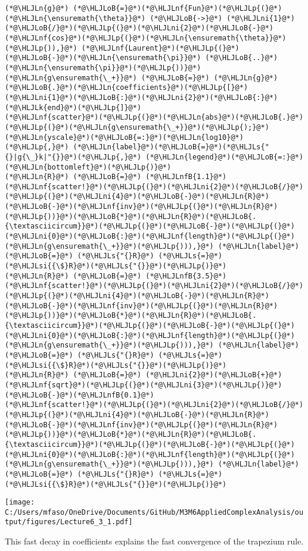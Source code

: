 \documentclass[12pt,landscape]{article}
\newcommand{\HLJLk}[1]{\textcolor[RGB]{148,91,176}{\textbf{#1}}}
\newcommand{\HLJLn}[1]{#1}
\newcommand{\HLJLnf}[1]{\textcolor[RGB]{66,102,213}{#1}}
\newcommand{\HLJLs}[1]{\textcolor[RGB]{201,61,57}{#1}}
\newcommand{\HLJLsi}[1]{#1}
\newcommand{\HLJLnfB}[1]{\textcolor[RGB]{59,151,46}{#1}}
\newcommand{\HLJLni}[1]{\textcolor[RGB]{59,151,46}{#1}}
\newcommand{\HLJLoB}[1]{\textcolor[RGB]{102,102,102}{\textbf{#1}}}
\newcommand{\HLJLp}[1]{#1}
\def\cent#1{\begin{center}#1\end{center} }
\begin{document}
{\newpage
\begin{lstlisting}
(*@\HLJLn{g}@*) (*@\HLJLoB{=}@*)(*@\HLJLnf{Fun}@*)(*@\HLJLp{(}@*)(*@\HLJLn{\ensuremath{\theta}}@*) (*@\HLJLoB{->}@*) (*@\HLJLni{1}@*)(*@\HLJLoB{/}@*)(*@\HLJLp{(}@*)(*@\HLJLni{2}@*)(*@\HLJLoB{-}@*)(*@\HLJLnf{cos}@*)(*@\HLJLp{(}@*)(*@\HLJLn{\ensuremath{\theta}}@*)(*@\HLJLp{)),}@*) (*@\HLJLnf{Laurent}@*)(*@\HLJLp{(}@*)(*@\HLJLoB{-}@*)(*@\HLJLn{\ensuremath{\pi}}@*) (*@\HLJLoB{..}@*) (*@\HLJLn{\ensuremath{\pi}}@*)(*@\HLJLp{))}@*)
(*@\HLJLn{g\ensuremath{\_+}}@*) (*@\HLJLoB{=}@*) (*@\HLJLn{g}@*)(*@\HLJLoB{.}@*)(*@\HLJLn{coefficients}@*)(*@\HLJLp{[}@*)(*@\HLJLni{1}@*)(*@\HLJLoB{:}@*)(*@\HLJLni{2}@*)(*@\HLJLoB{:}@*)(*@\HLJLk{end}@*)(*@\HLJLp{]}@*)
(*@\HLJLnf{scatter}@*)(*@\HLJLp{(}@*)(*@\HLJLn{abs}@*)(*@\HLJLoB{.}@*)(*@\HLJLp{(}@*)(*@\HLJLn{g\ensuremath{\_+}}@*)(*@\HLJLp{);}@*) (*@\HLJLn{yscale}@*)(*@\HLJLoB{=:}@*)(*@\HLJLn{log10}@*)(*@\HLJLp{,}@*) (*@\HLJLn{label}@*)(*@\HLJLoB{=}@*)(*@\HLJLs{"{}|g{\_}k|"{}}@*)(*@\HLJLp{,}@*) (*@\HLJLn{legend}@*)(*@\HLJLoB{=:}@*)(*@\HLJLn{bottomleft}@*)(*@\HLJLp{)}@*)
(*@\HLJLn{R}@*) (*@\HLJLoB{=}@*) (*@\HLJLnfB{1.1}@*)
(*@\HLJLnf{scatter!}@*)(*@\HLJLp{(}@*)(*@\HLJLni{2}@*)(*@\HLJLoB{/}@*)(*@\HLJLp{(}@*)(*@\HLJLni{4}@*)(*@\HLJLoB{-}@*)(*@\HLJLn{R}@*)(*@\HLJLoB{-}@*)(*@\HLJLnf{inv}@*)(*@\HLJLp{(}@*)(*@\HLJLn{R}@*)(*@\HLJLp{))}@*)(*@\HLJLoB{*}@*)(*@\HLJLn{R}@*)(*@\HLJLoB{.{\textasciicircum}}@*)(*@\HLJLp{(}@*)(*@\HLJLoB{-}@*)(*@\HLJLp{(}@*)(*@\HLJLni{0}@*)(*@\HLJLoB{:}@*)(*@\HLJLnf{length}@*)(*@\HLJLp{(}@*)(*@\HLJLn{g\ensuremath{\_+}}@*)(*@\HLJLp{))),}@*) (*@\HLJLn{label}@*) (*@\HLJLoB{=}@*) (*@\HLJLs{"{}R}@*) (*@\HLJLs{=}@*) (*@\HLJLsi{{\$}R}@*)(*@\HLJLs{"{}}@*)(*@\HLJLp{)}@*)
(*@\HLJLn{R}@*) (*@\HLJLoB{=}@*) (*@\HLJLnfB{3.5}@*)
(*@\HLJLnf{scatter!}@*)(*@\HLJLp{(}@*)(*@\HLJLni{2}@*)(*@\HLJLoB{/}@*)(*@\HLJLp{(}@*)(*@\HLJLni{4}@*)(*@\HLJLoB{-}@*)(*@\HLJLn{R}@*)(*@\HLJLoB{-}@*)(*@\HLJLnf{inv}@*)(*@\HLJLp{(}@*)(*@\HLJLn{R}@*)(*@\HLJLp{))}@*)(*@\HLJLoB{*}@*)(*@\HLJLn{R}@*)(*@\HLJLoB{.{\textasciicircum}}@*)(*@\HLJLp{(}@*)(*@\HLJLoB{-}@*)(*@\HLJLp{(}@*)(*@\HLJLni{0}@*)(*@\HLJLoB{:}@*)(*@\HLJLnf{length}@*)(*@\HLJLp{(}@*)(*@\HLJLn{g\ensuremath{\_+}}@*)(*@\HLJLp{))),}@*) (*@\HLJLn{label}@*) (*@\HLJLoB{=}@*) (*@\HLJLs{"{}R}@*) (*@\HLJLs{=}@*) (*@\HLJLsi{{\$}R}@*)(*@\HLJLs{"{}}@*)(*@\HLJLp{)}@*)
(*@\HLJLn{R}@*) (*@\HLJLoB{=}@*) (*@\HLJLni{2}@*)(*@\HLJLoB{+}@*)(*@\HLJLnf{sqrt}@*)(*@\HLJLp{(}@*)(*@\HLJLni{3}@*)(*@\HLJLp{)}@*)(*@\HLJLoB{-}@*)(*@\HLJLnfB{0.1}@*)
(*@\HLJLnf{scatter!}@*)(*@\HLJLp{(}@*)(*@\HLJLni{2}@*)(*@\HLJLoB{/}@*)(*@\HLJLp{(}@*)(*@\HLJLni{4}@*)(*@\HLJLoB{-}@*)(*@\HLJLn{R}@*)(*@\HLJLoB{-}@*)(*@\HLJLnf{inv}@*)(*@\HLJLp{(}@*)(*@\HLJLn{R}@*)(*@\HLJLp{))}@*)(*@\HLJLoB{*}@*)(*@\HLJLn{R}@*)(*@\HLJLoB{.{\textasciicircum}}@*)(*@\HLJLp{(}@*)(*@\HLJLoB{-}@*)(*@\HLJLp{(}@*)(*@\HLJLni{0}@*)(*@\HLJLoB{:}@*)(*@\HLJLnf{length}@*)(*@\HLJLp{(}@*)(*@\HLJLn{g\ensuremath{\_+}}@*)(*@\HLJLp{))),}@*) (*@\HLJLn{label}@*) (*@\HLJLoB{=}@*) (*@\HLJLs{"{}R}@*) (*@\HLJLs{=}@*) (*@\HLJLsi{{\$}R}@*)(*@\HLJLs{"{}}@*)(*@\HLJLp{)}@*)
\end{lstlisting}
\cent{\texttt{[image: C:/Users/mfaso/OneDrive/Documents/GitHub/M3M6AppliedComplexAnalysis/output/figures/Lecture6\_3\_1.pdf]}}
This fast decay in coefficients explains the fast convergence of the trapezium rule.

}
\end{document}
